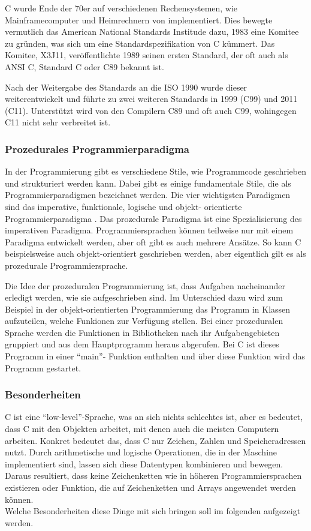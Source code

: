  C wurde Ende der 70er auf verschiedenen Rechensystemen, wie Mainframecomputer und
  Heimrechnern von implementiert. Dies bewegte vermutlich das American National Standards
  Institude dazu, 1983 eine Komitee zu gründen, was sich um eine Standardspezifikation von
  C kümmert. Das Komitee, X3J11, veröffentlichte 1989 seinen ersten Standard, der oft auch
  als ANSI C, Standard C oder C89 bekannt ist.
  
  Nach der Weitergabe des Standards an die \ac{ISO} 1990 wurde dieser weiterentwickelt und
  führte zu zwei weiteren Standards in 1999 (C99) und 2011 (C11). Unterstützt wird von den
  Compilern C89 und oft auch C99, wohingegen C11 nicht sehr verbreitet ist. \nocite{ritchie93}
 
 \subsubsection{Prozedurales Programmierparadigma}
  In der Programmierung gibt es verschiedene Stile, wie Programmcode geschrieben und strukturiert
  werden kann. Dabei gibt es einige fundamentale Stile, die als Programmierparadigmen bezeichnet
  werden. Die vier wichtigsten Paradigmen sind das imperative, funktionale, logische und objekt-
  orientierte Programmierparadigma \cite{normark03}. Das prozedurale Paradigma ist eine Spezialisierung des 
  imperativen Paradigma. Programmiersprachen können teilweise nur mit einem Paradigma entwickelt
  werden, aber oft gibt es auch mehrere Ansätze. So kann C beispielsweise auch objekt-orientiert
  geschrieben werden, aber eigentlich gilt es als prozedurale Programmiersprache.
  
  Die Idee der prozeduralen Programmierung ist, dass Aufgaben nacheinander erledigt werden, wie
  sie aufgeschrieben sind. Im Unterschied dazu wird zum Beispiel in der objekt-orientierten
  Programmierung das Programm in Klassen aufzuteilen, welche Funkionen zur Verfügung stellen. Bei
  einer prozeduralen Sprache werden die Funktionen in Bibliotheken nach ihr Aufgabengebieten
  gruppiert und aus dem Hauptprogramm heraus abgerufen. Bei C ist dieses Programm in einer ``main''-
  Funktion enthalten und über diese Funktion wird das Programm gestartet.

 \subsubsection{Besonderheiten}
 C ist eine ``low-level''-Sprache, was an sich nichts schlechtes ist, aber es bedeutet, dass C mit den
 Objekten arbeitet, mit denen auch die meisten Computern arbeiten. Konkret bedeutet das, dass
 C nur Zeichen, Zahlen und Speicheradressen nutzt. Durch arithmetische und logische Operationen,
 die in der Maschine implementiert sind, lassen sich diese Datentypen kombinieren und bewegen.
 Daraus resultiert, dass keine Zeichenketten wie in höheren Programmiersprachen existieren oder
 Funktion, die auf Zeichenketten und Arrays angewendet werden können. \cite{kernighan88} \\
 Welche Besonderheiten diese Dinge mit sich bringen soll im folgenden aufgezeigt werden.

